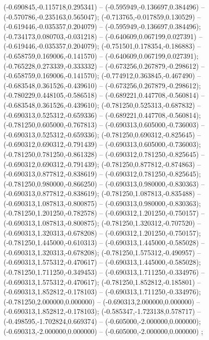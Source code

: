  (-0.690845,-0.115718,0.295341) -- (-0.595949,-0.136697,0.384496) -- (-0.570786,-0.235163,0.565047);
 (-0.713765,-0.017859,0.130529) -- (-0.619446,-0.035357,0.204079) -- (-0.595949,-0.136697,0.384496);
 (-0.734173,0.080703,-0.031218) -- (-0.640609,0.067199,0.027391) -- (-0.619446,-0.035357,0.204079);
 (-0.751501,0.178354,-0.186883) -- (-0.658759,0.169006,-0.141570) -- (-0.640609,0.067199,0.027391);
 (-0.765228,0.273339,-0.333332) -- (-0.673256,0.267879,-0.298612) -- (-0.658759,0.169006,-0.141570);
 (-0.774912,0.363845,-0.467490) -- (-0.683548,0.361526,-0.439610) -- (-0.673256,0.267879,-0.298612);
 (-0.780229,0.448105,-0.586518) -- (-0.689221,0.447708,-0.560814) -- (-0.683548,0.361526,-0.439610);
 (-0.781250,0.525313,-0.687832) -- (-0.690313,0.525312,-0.659336) -- (-0.689221,0.447708,-0.560814);
 (-0.781250,0.605000,-0.767813) -- (-0.690313,0.605000,-0.736003) -- (-0.690313,0.525312,-0.659336);
 (-0.781250,0.690312,-0.825645) -- (-0.690312,0.690312,-0.791439) -- (-0.690313,0.605000,-0.736003);
 (-0.781250,0.781250,-0.861328) -- (-0.690312,0.781250,-0.825645) -- (-0.690312,0.690312,-0.791439);
 (-0.781250,0.877812,-0.874863) -- (-0.690313,0.877812,-0.838619) -- (-0.690312,0.781250,-0.825645);
 (-0.781250,0.980000,-0.866250) -- (-0.690313,0.980000,-0.830363) -- (-0.690313,0.877812,-0.838619);
 (-0.781250,1.087813,-0.835488) -- (-0.690313,1.087813,-0.800875) -- (-0.690313,0.980000,-0.830363);
 (-0.781250,1.201250,-0.782578) -- (-0.690312,1.201250,-0.750157) -- (-0.690313,1.087813,-0.800875);
 (-0.781250,1.320312,-0.707520) -- (-0.690313,1.320313,-0.678208) -- (-0.690312,1.201250,-0.750157);
 (-0.781250,1.445000,-0.610313) -- (-0.690313,1.445000,-0.585028) -- (-0.690313,1.320313,-0.678208);
 (-0.781250,1.575312,-0.490957) -- (-0.690313,1.575312,-0.470617) -- (-0.690313,1.445000,-0.585028);
 (-0.781250,1.711250,-0.349453) -- (-0.690313,1.711250,-0.334976) -- (-0.690313,1.575312,-0.470617);
 (-0.781250,1.852812,-0.185801) -- (-0.690313,1.852812,-0.178103) -- (-0.690313,1.711250,-0.334976);
 (-0.781250,2.000000,0.000000) -- (-0.690313,2.000000,0.000000) -- (-0.690313,1.852812,-0.178103);
 (-0.585347,-1.723138,0.578717) -- (-0.498595,-1.702824,0.669374) -- (-0.605000,-2.000000,0.000000);
 (-0.690313,-2.000000,0.000000) -- (-0.605000,-2.000000,0.000000) ;
